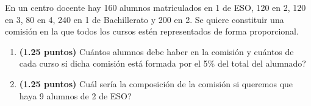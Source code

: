 
En un centro docente hay 160 alumnos matriculados en 1\textordmasculine{} de ESO, 120 en 2\textordmasculine{}, 120 en 3\textordmasculine{}, 80 en 4\textordmasculine{}, 240 en 1\textordmasculine{} de Bachillerato y 200 en 2\textordmasculine{}. Se quiere constituir una comisión en la que todos los cursos estén representados de forma proporcional.
\begin{enumerate}[label=\alph*)]
\item \textbf{(1.25 puntos)} \textquestiondown{}Cuántos alumnos debe haber en la comisión y cuántos de cada curso si dicha comisión está formada por el 5\% del total del alumnado?
\item \textbf{(1.25 puntos)} \textquestiondown{}Cuál sería la composición de la comisión si queremos que haya 9 alumnos de 2\textordmasculine{} de ESO?
\end{enumerate}
